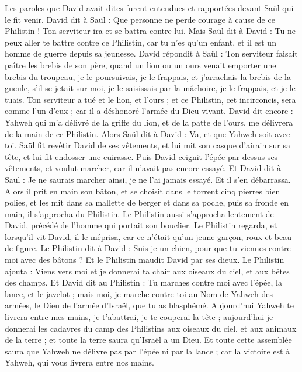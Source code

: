 \begin{multicols}{2}
Les paroles que David avait dites furent entendues et rapportées devant Saül qui le fit venir.
David dit à Saül : Que personne ne perde courage à cause de ce Philistin ! Ton serviteur ira et se battra contre lui.
Mais Saül dit à David : Tu ne peux aller te battre contre ce Philistin, car tu n'es qu'un enfant, et il est un homme de guerre depuis sa jeunesse.
David répondit à Saül : Ton serviteur faisait paître les brebis de son père, quand un lion ou un ours venait emporter une brebis du troupeau,
je le poursuivais, je le frappais, et j’arrachais la brebis de la gueule, s’il se jetait sur moi, je le saisissais par la mâchoire, je le frappais, et je le tuais.
Ton serviteur a tué et le lion, et l’ours ; et ce Philistin, cet incirconcis, sera comme l'un d'eux ; car il a déshonoré l’armée du Dieu vivant.
David dit encore : Yahweh qui m'a délivré de la griffe du lion, et de la patte de l'ours, me délivrera de la main de ce Philistin. Alors Saül dit à David : Va, et que Yahweh soit avec toi.
Saül fit revêtir David de ses vêtements, et lui mit son casque d'airain sur sa tête, et lui fit endosser une cuirasse.
Puis David ceignit l'épée par-dessus ses vêtements, et voulut marcher, car il n’avait pas encore essayé. Et David dit à Saül : Je ne saurais marcher ainsi, je ne l’ai jamais essayé. Et il s’en débarrassa.
Alors il prit en main son bâton, et se choisit dans le torrent cinq pierres bien polies, et les mit dans sa mallette de berger et dans sa poche, puis sa fronde en main, il s'approcha du Philistin.
Le Philistin aussi s'approcha lentement de David, précédé de l'homme qui portait son bouclier.
Le Philistin regarda, et lorsqu’il vit David, il le méprisa, car ce n'était qu'un jeune garçon, roux et beau de figure.
Le Philistin dit à David : Suis-je un chien, pour que tu viennes contre moi avec des bâtons ? Et le Philistin maudit David par ses dieux.
Le Philistin ajouta : Viens vers moi et je donnerai ta chair aux oiseaux du ciel, et aux bêtes des champs.
Et David dit au Philistin : Tu marches contre moi avec l'épée, la lance, et le javelot ; mais moi, je marche contre toi au Nom de Yahweh des armées, le Dieu de l’armée d'Israël, que tu as blasphémé.
Aujourd'hui Yahweh te livrera entre mes mains, je t’abattrai, je te couperai la tête ; aujourd'hui je donnerai les cadavres du camp des Philistins aux oiseaux du ciel, et aux animaux de la terre ; et toute la terre saura qu'Israël a un Dieu.
Et toute cette assemblée saura que Yahweh ne délivre pas par l'épée ni par la lance ; car la victoire est à Yahweh, qui vous livrera entre nos mains.

\end{multicols}
